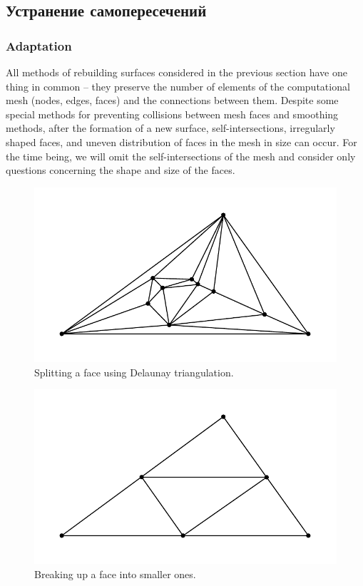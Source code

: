 \subsection{Устранение самопересечений}

\subsubsection{Adaptation}

All methods of rebuilding surfaces considered in the previous section have one thing in common -- they preserve the number of elements of the computational mesh (nodes, edges, faces) and the connections between them.
Despite some special methods for preventing collisions between mesh faces and smoothing methods, after the formation of a new surface, self-intersections, irregularly shaped faces, and uneven distribution of faces in the mesh in size can occur.
For the time being, we will omit the self-intersections of the mesh and consider only questions concerning the shape and size of the faces.

\begin{figure}[h]
\centering
\includegraphics[width=\textwidth]{pics/text_1_int/pic_delaunay.pdf}
\caption{Splitting a face using Delaunay triangulation.}\label{fig:pic_delaunay}
\end{figure}

\begin{figure}[h]
\centering
\includegraphics[width=\textwidth]{pics/text_1_int/pic_delaunay_2.pdf}
\caption{Breaking up a face into smaller ones.}\label{fig:pic_delaunay_2}
\end{figure}


